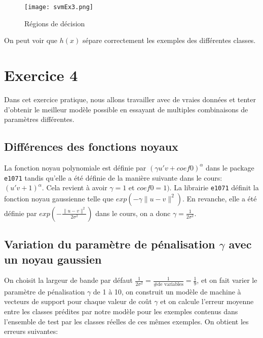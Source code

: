 \documentclass{article}
\begin{document}
\begin{multicols}{2}
\begin{figure}[H]
    \begin{center}
        \texttt{[image: svmEx3.png]}
        \centering
        \captionsetup{justification=centering}
        \caption{\label{fig:ex3}Régions de décision}
    \end{center}
\end{figure}

On peut voir que $h(x)$ sépare correctement les exemples des différentes
classes.

\section{Exercice 4}\label{sec:ex4}

Dans cet exercice pratique, nous allons travailler avec de vraies données et
tenter d'obtenir le meilleur modèle possible en essayant de multiples
combinaisons de paramètres différentes.

\subsection{Différences des fonctions noyaux}\label{subsec:ex41}

La fonction noyau polynomiale est définie par $(\gamma u' v + coef0)^{\alpha}$
dans le package \texttt{e1071} tandis qu'elle a été définie de la manière
suivante dans le cours: $(u' v + 1)^{\alpha}$. Cela revient à avoir $\gamma = 1$
et $coef0 = 1)$.
La librairie \texttt{e1071} définit la fonction noyau gaussienne telle que
$exp(-\gamma \parallel u - v \parallel^2)$. En revanche, elle a été définie par
$exp(-\frac{\parallel u - v \parallel^2}{2 \sigma^2})$ dans le cours, on a donc
$\gamma = \frac{1}{2 \sigma^2}$.

\subsection{Variation du paramètre de pénalisation $\gamma$ avec un noyau
gaussien}\label{subsec:ex42}

On choisit la largeur de bande par défaut
$\frac{1}{2 \sigma^2} = \frac{1}{\text{\# de variables}} = \frac{1}{9}$, et on
fait varier le paramètre de pénalisation $\gamma$ de 1 à 10, on construit un
modèle de machine à vecteurs de support pour chaque valeur de coût $\gamma$ et
on calcule l'erreur moyenne entre les classes prédites par notre modèle pour les
exemples contenus dans l'ensemble de test par les classes réelles de ces mêmes
exemples.
On obtient les erreurs suivantes:


\end{multicols}
\end{document}

